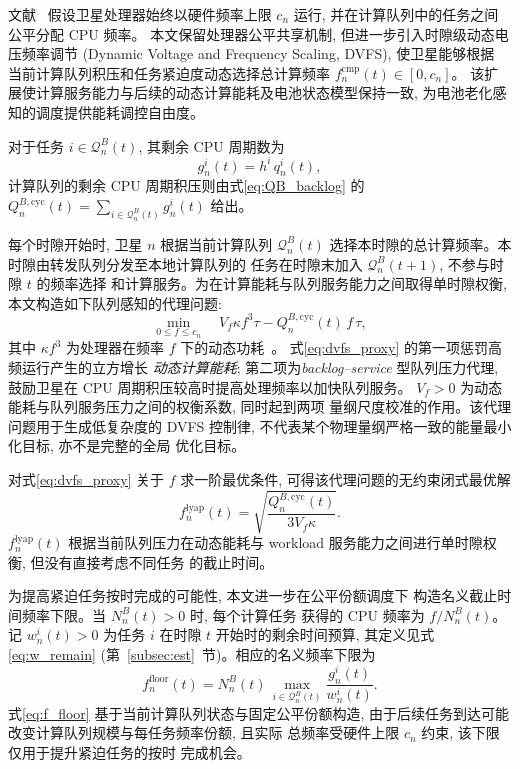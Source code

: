 \documentclass[a4paper,11pt]{article}
\begin{document}
文献~\cite{zhang2024mhspo} 假设卫星处理器始终以硬件频率上限
$c_n$ 运行, 并在计算队列中的任务之间公平分配 CPU 频率。
本文保留处理器公平共享机制, 但进一步引入时隙级动态电压频率调节
(Dynamic Voltage and Frequency Scaling, DVFS), 使卫星能够根据
当前计算队列积压和任务紧迫度动态选择总计算频率
$f^{\mathrm{cmp}}_n(t) \in [0, c_n]$。
该扩展使计算服务能力与后续的动态计算能耗及电池状态模型保持一致,
为电池老化感知的调度提供能耗调控自由度。

对于任务 $i \in \mathcal{Q}^B_n(t)$, 其剩余 CPU 周期数为
\begin{equation}
    g^i_n(t) = h^i\, q^i_n(t),
    \label{eq:remaining_cycles}
\end{equation}
计算队列的剩余 CPU 周期积压则由式\eqref{eq:QB_backlog} 的
$Q^{B,\mathrm{cyc}}_n(t) = \sum_{i \in \mathcal{Q}^B_n(t)} g^i_n(t)$ 给出。

每个时隙开始时, 卫星 $n$ 根据当前计算队列 $\mathcal{Q}^B_n(t)$
选择本时隙的总计算频率。本时隙由转发队列分发至本地计算队列的
任务在时隙末加入 $\mathcal{Q}^B_n(t+1)$, 不参与时隙 $t$ 的频率选择
和计算服务。为在计算能耗与队列服务能力之间取得单时隙权衡,
本文构造如下队列感知的代理问题:
\begin{equation}
    \min_{0 \le f \le c_n}\quad
    V_f \kappa f^3 \tau - Q^{B,\mathrm{cyc}}_n(t)\, f\, \tau,
    \label{eq:dvfs_proxy}
\end{equation}
其中 $\kappa f^3$ 为处理器在频率 $f$ 下的动态功耗~\cite{zhang2024mhspo}。
式\eqref{eq:dvfs_proxy} 的第一项惩罚高频运行产生的立方增长
\emph{动态计算能耗}; 第二项为\emph{backlog--service} 型队列压力代理,
鼓励卫星在 CPU 周期积压较高时提高处理频率以加快队列服务。
$V_f > 0$ 为动态能耗与队列服务压力之间的权衡系数, 同时起到两项
量纲尺度校准的作用。该代理问题用于生成低复杂度的 DVFS 控制律,
不代表某个物理量纲严格一致的能量最小化目标, 亦不是完整的全局
优化目标。

对式\eqref{eq:dvfs_proxy} 关于 $f$ 求一阶最优条件,
可得该代理问题的无约束闭式最优解
\begin{equation}
    f^{\mathrm{lyap}}_n(t) =
    \sqrt{\frac{Q^{B,\mathrm{cyc}}_n(t)}{3 V_f \kappa}}.
    \label{eq:f_lyap}
\end{equation}
$f^{\mathrm{lyap}}_n(t)$ 根据当前队列压力在动态能耗与
workload 服务能力之间进行单时隙权衡, 但没有直接考虑不同任务
的截止时间。

为提高紧迫任务按时完成的可能性, 本文进一步在公平份额调度下
构造名义截止时间频率下限。当 $N^B_n(t) > 0$ 时, 每个计算任务
获得的 CPU 频率为 $f / N^B_n(t)$。记 $w^i_n(t) > 0$ 为任务 $i$
在时隙 $t$ 开始时的剩余时间预算, 其定义见式\eqref{eq:w_remain}
(第~\ref{subsec:est}~节)。相应的名义频率下限为
\begin{equation}
    f^{\mathrm{floor}}_n(t) =
    N^B_n(t)\, \max_{i \in \mathcal{Q}^B_n(t)} \frac{g^i_n(t)}{w^i_n(t)}.
    \label{eq:f_floor}
\end{equation}
式\eqref{eq:f_floor} 基于当前计算队列状态与固定公平份额构造,
由于后续任务到达可能改变计算队列规模与每任务频率份额, 且实际
总频率受硬件上限 $c_n$ 约束, 该下限仅用于提升紧迫任务的按时
完成机会。
\end{document}
